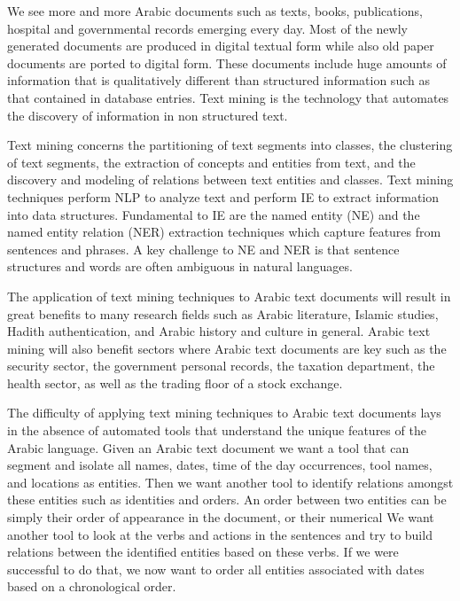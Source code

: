 \documentclass[12pt]{article}
\begin{document}
We see more and more Arabic documents such as texts,
books, publications, hospital and governmental records emerging 
every day.
Most of the newly generated documents are produced in digital 
textual form while also old paper documents are ported to digital 
form.
These documents include huge amounts of information that is 
qualitatively different than structured information such as that 
contained in database entries.
Text mining is the technology that automates the discovery of 
information in non structured text.

Text mining concerns the partitioning of text segments into classes,
the clustering of text segments,
the extraction of concepts and entities from text,
and the discovery and modeling of relations between text entities 
and classes.
Text mining techniques perform NLP to analyze text and perform 
IE to extract information into data structures.
Fundamental to IE are the named entity (NE) and the named entity 
relation (NER) extraction techniques which capture features from 
sentences and phrases.
A key challenge to NE and NER is that sentence structures and 
words are often ambiguous in natural languages.

The application of text mining techniques to Arabic text documents 
will result in great benefits to many research fields such as 
Arabic literature,
Islamic studies, Hadith authentication, and Arabic history and 
culture in general.
Arabic text mining will also benefit sectors where Arabic text 
documents are key such as the security sector,
the government personal records,
the taxation department,
the health sector,
as well as the trading floor of a stock exchange.
 
The difficulty of applying text mining techniques to Arabic text 
documents lays in the absence of automated tools that understand 
the unique features of the Arabic language.
Given an Arabic text document we want a tool that can segment 
and isolate all names, dates, time of the day occurrences,
tool names, and locations as entities.
Then we want another tool to identify relations amongst 
these entities such as identities and orders.
An order between two entities can be simply 
their order of appearance in the document, or their
numerical 
 We want another tool to look at the verbs and actions in the sentences and try to build relations between the identified entities based on these verbs.
 If we were successful to do that,
 we now want to order all entities associated with dates based on a chronological order.
\end{document}
